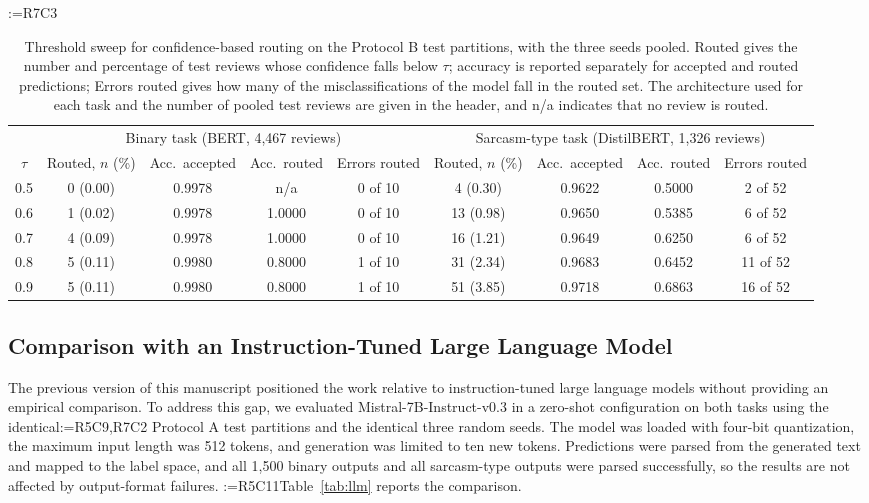 \documentclass[a4paper,fleqn]{cas-sc}
\makeatletter
\newif\iftracked
\newcommand{\rv@setcolour}[1]{%
  \IfStrEq{#1}{R7C7}{\color{rvEdit}}{%
    \IfSubStr{#1}{R5}{\IfSubStr{#1}{R7}{\color{rvBoth}}{\color{rvFive}}}{\color{rvSeven}}}}
\newcommand{\rv@tag}[1]{\textsuperscript{\sffamily\bfseries\scriptsize[\StrSubstitute{#1}{,}{, }]}\,}
\newcommand{\rv@recordone}[1]{%
  \edef\rv@i{#1}%
  \ifcsdef{rv@n@\rv@i}{}{\csgdef{rv@n@\rv@i}{0}}%
  \csxdef{rv@n@\rv@i}{\the\numexpr\csuse{rv@n@\rv@i}+1\relax}%
  \begingroup\edef\@currentlabel{\rv@i}\label{rv:\rv@i:\csuse{rv@n@\rv@i}}\endgroup}
\newcommand{\rv@record}[1]{\@for\rv@id:=#1\do{\expandafter\rv@recordone\expandafter{\rv@id}}}
\DeclareRobustCommand{\rc}[2]{\rv@record{#1}\iftracked{\rv@setcolour{#1}\rv@tag{#1}#2}\else#2\fi}
\DeclareRobustCommand{\rcx}[2]{\iftracked{\rv@setcolour{#1}\rv@tag{#1}#2}\else#2\fi}
\DeclareRobustCommand{\rcmark}[1]{\rv@record{#1}}
\DeclareRobustCommand{\rcrep}[3]{\rv@record{#1}\iftracked{\rv@setcolour{#1}\rv@tag{#1}\rv@strike{#2} #3}\else#3\fi}
\makeatother
\begin{document}
\begin{table}[t]
\caption{\rcx{R7C3}{Threshold sweep for confidence-based routing on the Protocol B test partitions, with the three seeds pooled. Routed gives the number and percentage of test reviews whose confidence falls below $\tau$; accuracy is reported separately for accepted and routed predictions; Errors routed gives how many of the misclassifications of the model fall in the routed set. The architecture used for each task and the number of pooled test reviews are given in the header, and n/a indicates that no review is routed.}}
\rcmark{R7C3}
\label{tab:routing}
\centering\small
\iftracked\color{rvSeven}\fi
\begin{adjustbox}{max width=\textwidth}
\begin{tabular}{ccccccccc}
\toprule
 & \multicolumn{4}{c}{Binary task (BERT, 4,467 reviews)} & \multicolumn{4}{c}{Sarcasm-type task (DistilBERT, 1,326 reviews)} \\
\cmidrule(lr){2-5}\cmidrule(lr){6-9}
$\tau$ & Routed, $n$ (\%) & Acc.\ accepted & Acc.\ routed & Errors routed & Routed, $n$ (\%) & Acc.\ accepted & Acc.\ routed & Errors routed \\
\midrule
0.5 & 0 (0.00) & 0.9978 & n/a & 0 of 10 & 4 (0.30) & 0.9622 & 0.5000 & 2 of 52 \\
0.6 & 1 (0.02) & 0.9978 & 1.0000 & 0 of 10 & 13 (0.98) & 0.9650 & 0.5385 & 6 of 52 \\
0.7 & 4 (0.09) & 0.9978 & 1.0000 & 0 of 10 & 16 (1.21) & 0.9649 & 0.6250 & 6 of 52 \\
0.8 & 5 (0.11) & 0.9980 & 0.8000 & 1 of 10 & 31 (2.34) & 0.9683 & 0.6452 & 11 of 52 \\
0.9 & 5 (0.11) & 0.9980 & 0.8000 & 1 of 10 & 51 (3.85) & 0.9718 & 0.6863 & 16 of 52 \\
\bottomrule
\end{tabular}
\end{adjustbox}
\end{table}

\subsection{Comparison with an Instruction-Tuned Large Language Model}
\label{sec:llm}
The previous version of this manuscript positioned the work relative to instruction-tuned large language models without providing an empirical comparison. To address this gap, we evaluated Mistral-7B-Instruct-v0.3 in a zero-shot configuration on both tasks using the identical\rc{R5C9,R7C2}{ Protocol A} test partitions and the identical three random seeds. The model was loaded with four-bit quantization, the maximum input length was 512 tokens, and generation was limited to ten new tokens. Predictions were parsed from the generated text and mapped to the label space, and all 1,500 binary outputs and all sarcasm-type outputs were parsed successfully, so the results are not affected by output-format failures. \rcrep{R5C11}{Table 12}{Table~\ref{tab:llm}} reports the comparison.
\end{document}
